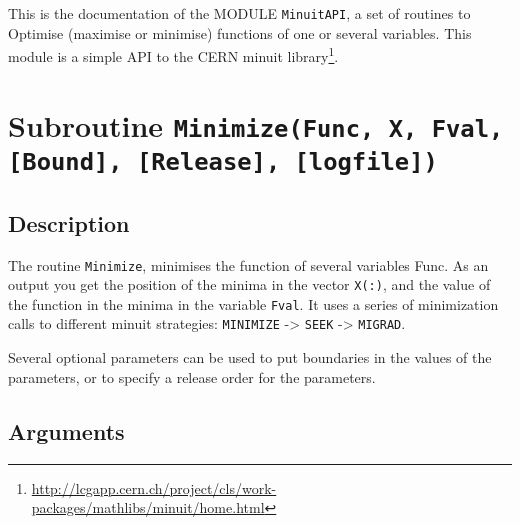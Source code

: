 
This is the documentation of the MODULE \texttt{MinuitAPI}, a set
of routines to Optimise (maximise or minimise) functions of one or
several variables. This module is a simple API to the CERN minuit
library\footnote{\href{http://lcgapp.cern.ch/project/cls/work-packages/mathlibs/minuit/home.html}{http://lcgapp.cern.ch/project/cls/work-packages/mathlibs/minuit/home.html}}. 

\section{Subroutine \texttt{Minimize(Func, X, Fval, [Bound], [Release], [logfile]) }}

\subsection{Description}

The routine \texttt{Minimize}, minimises the function of several
variables Func. As an output you get the position of the minima in the
vector \texttt{X(:)}, and the value of the function in the minima in
the variable \texttt{Fval}. It uses a series of minimization calls to
different minuit strategies: \texttt{MINIMIZE} -> \texttt{SEEK} ->
\texttt{MIGRAD}.  

Several optional parameters can be used to put boundaries in the
values of the parameters, or to specify a release order for the
parameters. 

\subsection{Arguments}

